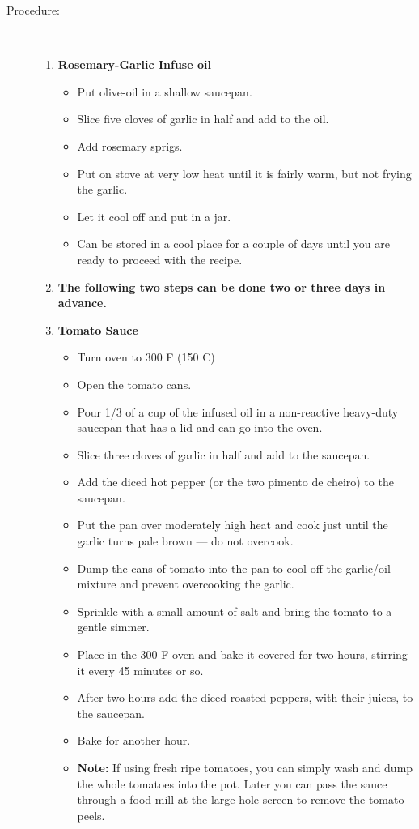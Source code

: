 \documentclass [11pt, letterpaper] {article}
\begin{document}
\begin{description}
\item[Procedure:]\ \\
	\begin{enumerate}
	\item {\bf Rosemary-Garlic Infuse oil}
	\begin{itemize}
	\item Put olive-oil in a shallow saucepan.
	\item Slice five cloves of garlic in half and add to the oil.
	\item Add rosemary sprigs.
	\item Put on stove at very low heat until it is fairly warm, but not frying the garlic.
	\item Let it cool off and put in a jar.
	\item Can be stored in a cool place for a couple of days until you are ready to proceed with the recipe.
	\end{itemize}
	\item {\bf The following two steps can be done two or three days in advance.}
	\item {\bf Tomato Sauce}
	\begin{itemize}
	\item Turn oven to 300 F (150 C)
	\item Open the tomato cans. 
	\item Pour 1/3 of a cup of the infused oil in a non-reactive heavy-duty saucepan that has a lid and can go into the oven.
	\item Slice three cloves of garlic in half and add to the saucepan.
	\item Add the diced hot pepper (or the two pimento de cheiro) to the saucepan.
	\item Put the pan over moderately high heat and cook just until the garlic turns pale brown --- do not overcook.
	\item Dump the cans of tomato into the pan to cool off the garlic/oil mixture and prevent overcooking the garlic.
	\item Sprinkle with a small amount of salt and bring the tomato to a gentle simmer.
	\item Place in the 300 F oven and bake it covered for two hours, stirring it every 45 minutes or so.
	\item After two hours add the diced roasted peppers, with their juices, to the saucepan.
	\item Bake for another hour.
	\item {\bf Note:} If using fresh ripe tomatoes, you can simply wash and dump the whole tomatoes into the pot. Later you can pass the sauce through a food mill at the large-hole screen to remove the tomato peels.

\end{itemize}
\end{enumerate}
\end{description}
\end{document}
